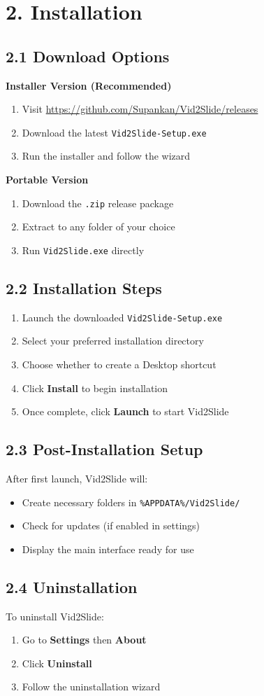\documentclass[12pt,a4paper]{article}
\newcommand{\sectionTitle}[1]{\section*{#1}}
\newcommand{\subsectionTitle}[1]{\subsection*{#1}}
\newcommand{\code}[1]{\texttt{#1}}
\begin{document}
\newpage

\sectionTitle{2. Installation}

\subsectionTitle{2.1 Download Options}

\textbf{Installer Version (Recommended)}
\begin{enumerate}
    \item Visit \url{https://github.com/Supankan/Vid2Slide/releases}
    \item Download the latest \code{Vid2Slide-Setup.exe}
    \item Run the installer and follow the wizard
\end{enumerate}

\textbf{Portable Version}
\begin{enumerate}
    \item Download the \code{.zip} release package
    \item Extract to any folder of your choice
    \item Run \code{Vid2Slide.exe} directly
\end{enumerate}

\subsectionTitle{2.2 Installation Steps}

\begin{enumerate}
    \item Launch the downloaded \code{Vid2Slide-Setup.exe}
    \item Select your preferred installation directory
    \item Choose whether to create a Desktop shortcut
    \item Click \textbf{Install} to begin installation
    \item Once complete, click \textbf{Launch} to start Vid2Slide
\end{enumerate}

\subsectionTitle{2.3 Post-Installation Setup}

After first launch, Vid2Slide will:
\begin{itemize}
    \item Create necessary folders in \code{\%APPDATA\%/Vid2Slide/}
    \item Check for updates (if enabled in settings)
    \item Display the main interface ready for use
\end{itemize}

\subsectionTitle{2.4 Uninstallation}

To uninstall Vid2Slide:
\begin{enumerate}
    \item Go to \textbf{Settings} then \textbf{About}
    \item Click \textbf{Uninstall}
    \item Follow the uninstallation wizard
\end{enumerate}
\end{document}
